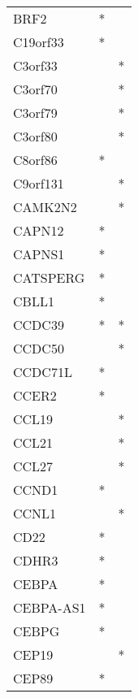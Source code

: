 \begin{longtable}{lcc}
BRF2             &              * &            \\
C19orf33         &              * &            \\
C3orf33          &                &          * \\
C3orf70          &                &          * \\
C3orf79          &                &          * \\
C3orf80          &                &          * \\
C8orf86          &              * &            \\
C9orf131         &                &          * \\
CAMK2N2          &                &          * \\
CAPN12           &              * &            \\
CAPNS1           &              * &            \\
CATSPERG         &              * &            \\
CBLL1            &              * &            \\
CCDC39           &              * &          * \\
CCDC50           &                &          * \\
CCDC71L          &              * &            \\
CCER2            &              * &            \\
CCL19            &                &          * \\
CCL21            &                &          * \\
CCL27            &                &          * \\
CCND1            &              * &            \\
CCNL1            &                &          * \\
CD22             &              * &            \\
CDHR3            &              * &            \\
CEBPA            &              * &            \\
CEBPA-AS1        &              * &            \\
CEBPG            &              * &            \\
CEP19            &                &          * \\
CEP89            &              * &            \\

\end{longtable}
